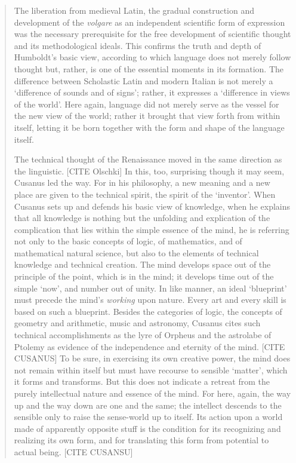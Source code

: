 \begin{quote}
    The liberation from medieval Latin, the gradual construction and development of the \emph{volgare} as an independent scientific form of expression was the necessary prerequisite for the free development of scientific thought and its methodological ideals.  This confirms the truth and depth of Humboldt's basic view, according to which language does not merely follow thought but, rather, is one of the essential moments in its formation.  The difference between Scholastic Latin and modern Italian is not merely a `difference of sounds and of signs'; rather, it expresses a `difference in views of the world'.  Here again, language did not merely serve as the vessel for the new view of the world; rather it brought that view forth from within itself, letting it be born together with the form and shape of the language itself.  

    The technical thought of the Renaissance moved in the same direction as the linguistic. [CITE Olschki]  In this, too, surprising though it may seem, Cusanus led the way.  For in his philosophy, a new meaning and a new place are given to the technical spirit, the spirit of the `inventor'.  When Cusanus sets up and defends his basic view of knowledge, when he explains that all knowledge is nothing but the unfolding and explication of the complication that lies within the simple essence of the mind, he is referring not only to the basic concepts of logic, of mathematics, and of mathematical natural science, but also to the elements of technical knowledge and technical creation.  The mind develops space out of the principle of the point, which is in the mind; it develops time out of the simple `now', and number out of unity.  In like manner, an ideal `blueprint' must precede the mind's \emph{working} upon nature.  Every art and every skill is based on such a blueprint.  Besides the categories of logic, the concepts of geometry and arithmetic, music and astronomy, Cusanus cites such technical accomplishments as the lyre of Orpheus and the astrolabe of Ptolemy as evidence of the independence and eternity of the mind. [CITE CUSANUS]  To be sure, in exercising its own creative power, the mind does not remain within itself but must have recourse to sensible `matter', which it forms and transforms.  But this does not indicate a retreat from the purely intellectual nature and essence of the mind.  For here, again, the way up and the way down are one and the same; the intellect descends to the sensible only to raise the sense-world up to itself.  Its action upon a world made of apparently opposite stuff is the condition for its recognizing and realizing its own form, and for translating this form from potential to actual being.  [CITE CUSANSU]


\end{quote}
